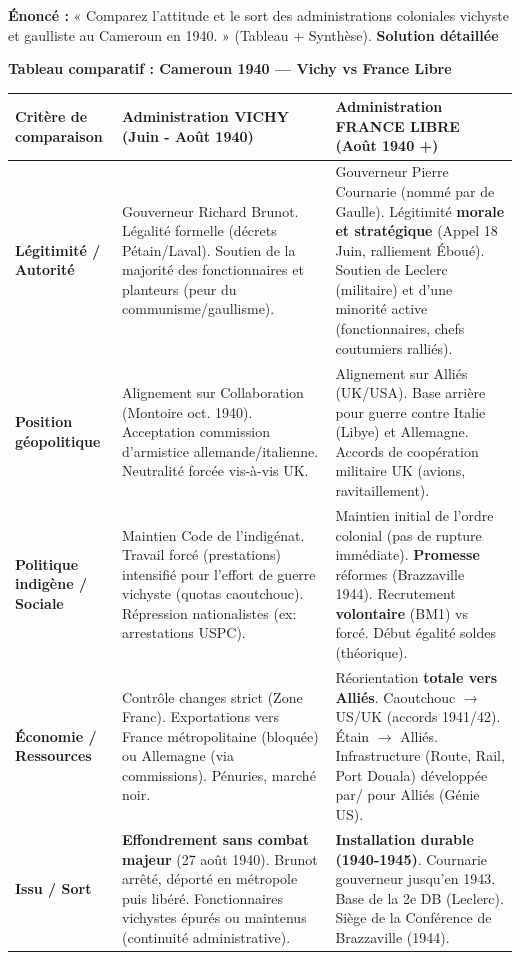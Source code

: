 \documentclass[11pt]{article}
\newcommand{\cle}[1]{{\popxbold\color{popdark}#1}}
\begin{document}
\begin{exoresolu}
\textbf{Énoncé :} « Comparez l'attitude et le sort des administrations coloniales vichyste et gaulliste au Cameroun en 1940. » (Tableau + Synthèse).
\tcblower
\textbf{Solution détaillée}

\textbf{Tableau comparatif : Cameroun 1940 — Vichy vs France Libre}

\begin{center}
\begin{tabularx}{\linewidth}{|>{\bfseries}X|X|X|}\hline
\rowcolor{popblueL}
\textbf{Critère de comparaison} & \textbf{Administration VICHY (Juin - Août 1940)} & \textbf{Administration FRANCE LIBRE (Août 1940 +)} \\ \hline
\textbf{Légitimité / Autorité} & Gouverneur \cle{Richard Brunot}. Légalité formelle (décrets Pétain/Laval). Soutien de la majorité des fonctionnaires et planteurs (peur du communisme/gaullisme). & Gouverneur \cle{Pierre Cournarie} (nommé par de Gaulle). Légitimité \textbf{morale et stratégique} (Appel 18 Juin, ralliement Éboué). Soutien de Leclerc (militaire) et d'une minorité active (fonctionnaires, chefs coutumiers ralliés). \\ \hline
\textbf{Position géopolitique} & Alignement sur \cle{Collaboration} (Montoire oct. 1940). Acceptation commission d'armistice allemande/italienne. Neutralité forcée vis-à-vis UK. & Alignement sur \cle{Alliés} (UK/USA). Base arrière pour guerre contre Italie (Libye) et Allemagne. Accords de coopération militaire UK (avions, ravitaillement). \\ \hline
\textbf{Politique indigène / Sociale} & Maintien \cle{Code de l'indigénat}. Travail forcé (\cle{prestations}) intensifié pour l'effort de guerre vichyste (quotas caoutchouc). Répression nationalistes (ex: arrestations USPC). & Maintien initial de l'ordre colonial (pas de rupture immédiate). \textbf{Promesse} réformes (Brazzaville 1944). Recrutement \textbf{volontaire} (BM1) vs forcé. Début égalité soldes (théorique). \\ \hline
\textbf{Économie / Ressources} & Contrôle changes strict (Zone Franc). Exportations vers France métropolitaine (bloquée) ou Allemagne (via commissions). Pénuries, marché noir. & Réorientation \textbf{totale vers Alliés}. Caoutchouc $\rightarrow$ US/UK (accords 1941/42). Étain $\rightarrow$ Alliés. Infrastructure (Route, Rail, Port Douala) développée par/ pour Alliés (Génie US). \\ \hline
\textbf{Issu / Sort} & \textbf{Effondrement sans combat majeur} (27 août 1940). Brunot arrêté, déporté en métropole puis libéré. Fonctionnaires vichystes épurés ou maintenus (continuité administrative). & \textbf{Installation durable (1940-1945)}. Cournarie gouverneur jusqu'en 1943. Base de la \cle{2e DB} (Leclerc). Siège de la Conférence de Brazzaville (1944). \\ \hline
\end{tabularx}
\end{center}


\end{exoresolu}
\end{document}
